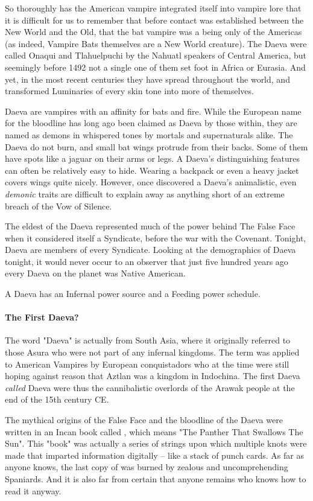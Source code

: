 So thoroughly has the American vampire integrated itself into vampire lore that it is difficult for us to remember that before contact was established between the New World and the Old, that the bat vampire was a being only of the Americas (as indeed, Vampire Bats themselves are a New World creature). The Daeva were called Onaqui and Tlahuelpuchi by the Nahuatl speakers of Central America, but seemingly before 1492 not a single one of them set foot in Africa or Eurasia. And yet, in the most recent centuries they have spread throughout the world, and transformed Luminaries of every skin tone into more of themselves.

Daeva are vampires with an affinity for bats and fire. While the European name for the bloodline has long ago been claimed as Daeva by those within, they are named as demons in whispered tones by mortals and supernaturals alike. The Daeva do not burn, and small bat wings protrude from their backs. Some of them have spots like a jaguar on their arms or legs. A Daeva's distinguishing features can often be relatively easy to hide. Wearing a backpack or even a heavy jacket covers wings quite nicely. However, once discovered a Daeva's animalistic, even \textit{demonic} traits are difficult to explain away as anything short of an extreme breach of the Vow of Silence.

The eldest of the Daeva represented much of the power behind The False Face when it considered itself a Syndicate, before the war with the Covenant. Tonight, Daeva are members of every Syndicate. Looking at the demographics of Daeva tonight, it would never occur to an observer that just five hundred years ago every Daeva on the planet was Native American.

A Daeva has an Infernal power source and a Feeding power schedule.

\paragraph{The First Daeva?} The word "Daeva" is actually from South Asia, where it originally referred to those Asura who were not part of any infernal kingdoms. The term was applied to American Vampires by European conquistadors who at the time were still hoping against reason that Aztlan was a kingdom in Indochina. The first Daeva \textit{called} Daeva were thus the cannibalistic overlords of the Arawak people at the end of the 15th century CE.

The mythical origins of the False Face and the bloodline of the Daeva were written in an Incan book called , which means "The Panther That Swallows The Sun". This "book" was actually a series of strings upon which multiple knots were made that imparted information digitally -- like a stack of punch cards. As far as anyone knows, the last copy of  was burned by zealous and uncomprehending Spaniards. And it is also far from certain that anyone remains who knows how to read it anyway.

